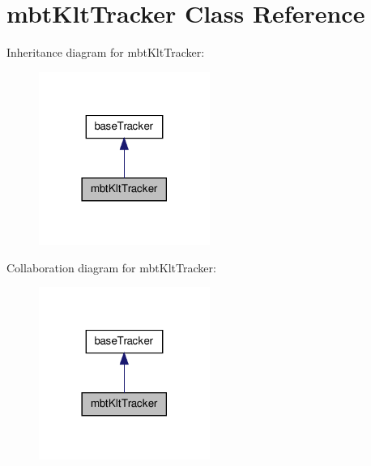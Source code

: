 \hypertarget{classmbtKltTracker}{\section{mbt\-Klt\-Tracker \-Class \-Reference}
\label{classmbtKltTracker}
}


\-Inheritance diagram for mbt\-Klt\-Tracker\-:
\nopagebreak
\begin{figure}[H]
\begin{center}
\leavevmode
\includegraphics[width=158pt]{classmbtKltTracker__inherit__graph}
\end{center}
\end{figure}


\-Collaboration diagram for mbt\-Klt\-Tracker\-:
\nopagebreak
\begin{figure}[H]
\begin{center}
\leavevmode
\includegraphics[width=158pt]{classmbtKltTracker__coll__graph}
\end{center}
\end{figure}
